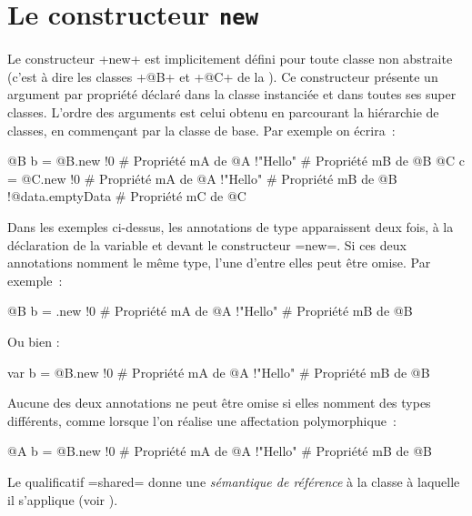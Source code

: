 \section{Le constructeur \texttt{new}}

Le constructeur \ggs+new+ est implicitement défini pour toute classe non abstraite (c'est à dire les classes \ggs+@B+ et \ggs+@C+ de la ). Ce constructeur présente un argument par propriété déclaré dans la classe instanciée et dans toutes ses super classes. L'ordre des arguments est celui obtenu en parcourant la hiérarchie de classes, en commençant par la classe de base. Par exemple on écrira~:

\begin{galgas}
@B b = @B.new {
  !0 # Propriété mA de @A
  !"Hello" # Propriété mB de @B
}
@C c = @C.new {
  !0 # Propriété mA de @A
  !"Hello" # Propriété mB de @B
  !@data.emptyData # Propriété mC de @C
}
\end{galgas}

Dans les exemples ci-dessus, les annotations de type apparaissent deux fois, à la déclaration de la variable et devant le constructeur \ggs=new=. Si ces deux annotations nomment le même type, l'une d'entre elles peut être omise. Par exemple~:

\begin{galgas}
@B b = .new {
  !0 # Propriété mA de @A
  !"Hello" # Propriété mB de @B
}
\end{galgas}

Ou bien :
\begin{galgas}
var b = @B.new {
  !0 # Propriété mA de @A
  !"Hello" # Propriété mB de @B
}
\end{galgas}

Aucune des deux annotations ne peut être omise si elles nomment des types différents, comme lorsque l'on réalise une affectation polymorphique~:

\begin{galgas}
@A b = @B.new {
  !0 # Propriété mA de @A
  !"Hello" # Propriété mB de @B
}
\end{galgas}








Le qualificatif \ggs=shared= donne une \emph{sémantique de référence} à la classe à laquelle il s'applique (voir ).

